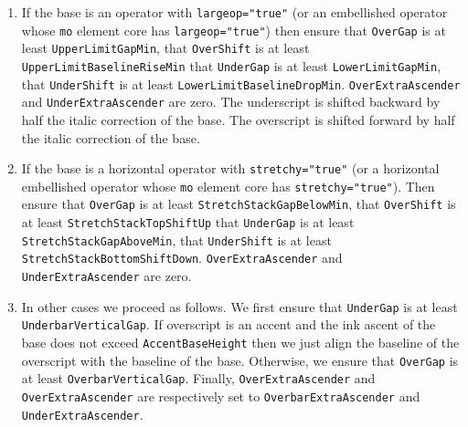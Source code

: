 \begin{enumerate}
\item If the base is an operator with {\tt largeop="true"}
  (or an embellished operator whose {\tt mo} element core has
  {\tt largeop="true"}) then ensure that {\tt OverGap} is at least
  {\tt UpperLimitGapMin}, that {\tt OverShift} is at least
  {\tt UpperLimitBaselineRiseMin} that {\tt UnderGap} is at
  least
  {\tt LowerLimitGapMin}, that {\tt UnderShift} is at least
  {\tt LowerLimitBaselineDropMin}.
  {\tt OverExtraAscender} and
  {\tt UnderExtraAscender} are zero. The
  underscript is shifted backward by half the italic correction of the base.
  The overscript is shifted forward by half the italic correction of the base.
\item If the base is a horizontal operator with {\tt stretchy="true"}
  (or a horizontal embellished operator whose {\tt mo} element core has
  {\tt stretchy="true"}). Then ensure that {\tt OverGap} is at least
  {\tt StretchStackGapBelowMin}, that {\tt OverShift} is at
  least
  {\tt StretchStackTopShiftUp} that {\tt UnderGap} is at least
  {\tt StretchStackGapAboveMin},
  that {\tt UnderShift} is at least
  {\tt StretchStackBottomShiftDown}.
  {\tt OverExtraAscender} and
  {\tt UnderExtraAscender} are zero.
\item In other cases we proceed as follows.
  We first ensure that {\tt UnderGap} is at least
  {\tt UnderbarVerticalGap}.
  If overscript is an accent
  and the ink ascent of the base does not exceed
  {\tt AccentBaseHeight}
  then we just align the baseline of the overscript with the baseline
  of the base. Otherwise, we ensure that {\tt OverGap} is at least
  {\tt OverbarVerticalGap}. Finally,
  {\tt OverExtraAscender} and
  {\tt OverExtraAscender} are respectively set to
  {\tt OverbarExtraAscender}
  and {\tt UnderExtraAscender}.
\end{enumerate}


